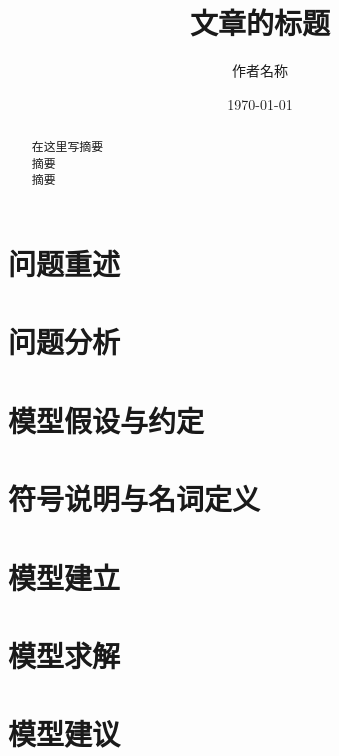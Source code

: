 \documentclass{article}
\title{文章的标题}                                          %
\author {作者名称}                                          %
\date{\today}                                               %
\begin{document}
\setlength{\parindent}{0em}
\maketitle                                                  %
\thispagestyle{empty}                                       %
\begin{abstract}                                            %
在这里写摘要\\ 摘要\\ 摘要
\end{abstract}                                              %
\newpage                                                    %
\tableofcontents                                            %
\thispagestyle{empty}                                       %
\newpage                                                    %
\setcounter{page}{1}                                        %
\section{问题重述}                                          %
\newpage
\section{问题分析}
\newpage                                                    %
\section{模型假设与约定}
\newpage                                                    %
\section{符号说明与名词定义}
\newpage                                                    %
\section{模型建立}
\newpage                                                    %
\section{模型求解}
\newpage                                                    %
\section{模型建议}
\newpage                                                    %
\end{document}

